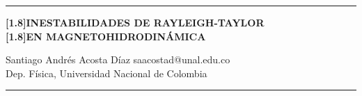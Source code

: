 \author[1]{Santiago Andrés Acosta Díaz (saacostad@unal.edu.co)}

\thispagestyle{empty} 

\hrule

\vspace{0.5cm}

\begin{center}
{   
    \huge\bfseries
    \scalebox{1}[1.8]{INESTABILIDADES DE RAYLEIGH-TAYLOR}\\ [0.3em]
    \scalebox{1}[1.8]{EN MAGNETOHIDRODINÁMICA}
}
\end{center}

\vspace{1cm}

{\large Santiago Andrés Acosta Díaz} \hfill saacostad@unal.edu.co \\ 
{\small Dep. Física, Universidad Nacional de Colombia}

\begin{center}
    \rule{15cm}{2pt}
\end{center}

\vspace{0.5cm}
